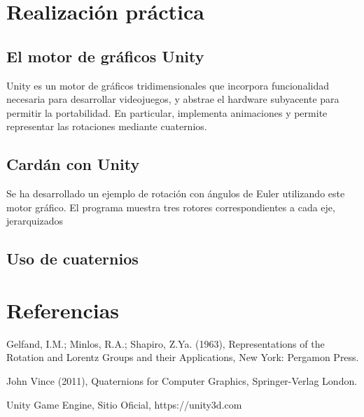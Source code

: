 \documentclass{article}
\theoremstyle{plain}
\theoremstyle{definition}
\theoremstyle{remark}
\begin{document}
\section{Realización práctica}

\subsection{El motor de gráficos Unity}

Unity \cite{unity} es un motor de gráficos tridimensionales que incorpora funcionalidad necesaria para desarrollar videojuegos, y abstrae el hardware subyacente para permitir la portabilidad. En particular, implementa animaciones y permite representar las rotaciones mediante cuaternios.

\subsection{Cardán con Unity}

Se ha desarrollado un ejemplo de rotación con ángulos de Euler utilizando este motor gráfico. El programa muestra tres rotores correspondientes a cada eje, jerarquizados 

\subsection{Uso de cuaternios}

\section{Referencias}

\begin{thebibliography}{9}

  Gelfand, I.M.; Minlos, R.A.; Shapiro, Z.Ya. (1963),
  Representations of the Rotation and Lorentz Groups and their Applications,
  New York: Pergamon Press.

  John Vince (2011),
  Quaternions for Computer Graphics,
  Springer-Verlag London.

  Unity Game Engine,
  Sitio Oficial,
  https://unity3d.com

\end{thebibliography}
\end{document}
